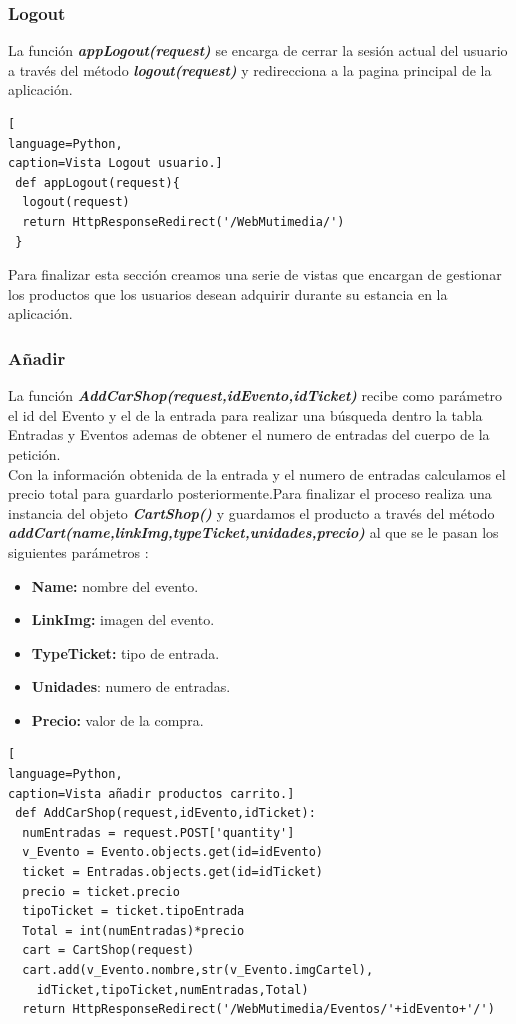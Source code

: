 \subsubsection*{Logout}
La función \textit{\textbf{appLogout(request)}} se encarga de cerrar la sesión actual del usuario a través del método \textit{\textbf{logout(request)}} y redirecciona a la pagina principal de la aplicación.
\begin{lstlisting}[
language=Python,
caption=Vista Logout usuario.]
 def appLogout(request){
  logout(request)
  return HttpResponseRedirect('/WebMutimedia/')
 }
\end{lstlisting}
Para finalizar esta sección creamos una serie de vistas que encargan de gestionar los productos que los usuarios desean adquirir durante su estancia en la aplicación.
\subsubsection*{Añadir}
La función \textit{\textbf{AddCarShop(request,idEvento,idTicket)}} recibe como parámetro el id del Evento y el de la entrada para realizar una búsqueda dentro la tabla Entradas y Eventos ademas de obtener el numero de entradas del cuerpo de la petición.
\\Con la información obtenida de la entrada y el numero de entradas calculamos el precio total para guardarlo posteriormente.Para finalizar el proceso realiza una instancia del objeto \textit{\textbf{CartShop()}} y guardamos el producto a través del método \textit{\textbf{addCart(name,linkImg,type\-Ticket,unidades,precio)}} al que se le pasan los siguientes parámetros :
\begin{itemize}
  \item \textbf{Name:} nombre del evento.
  \item \textbf{LinkImg:} imagen del evento.
  \item \textbf{TypeTicket:} tipo de entrada.
  \item \textbf{Unidades}: numero de entradas.
  \item \textbf{Precio:} valor de la compra.
\end{itemize}
\begin{lstlisting}[
language=Python,
caption=Vista añadir productos carrito.]
 def AddCarShop(request,idEvento,idTicket):
  numEntradas = request.POST['quantity']
  v_Evento = Evento.objects.get(id=idEvento)
  ticket = Entradas.objects.get(id=idTicket)
  precio = ticket.precio
  tipoTicket = ticket.tipoEntrada
  Total = int(numEntradas)*precio
  cart = CartShop(request)
  cart.add(v_Evento.nombre,str(v_Evento.imgCartel),
    idTicket,tipoTicket,numEntradas,Total)
  return HttpResponseRedirect('/WebMutimedia/Eventos/'+idEvento+'/')
\end{lstlisting}

